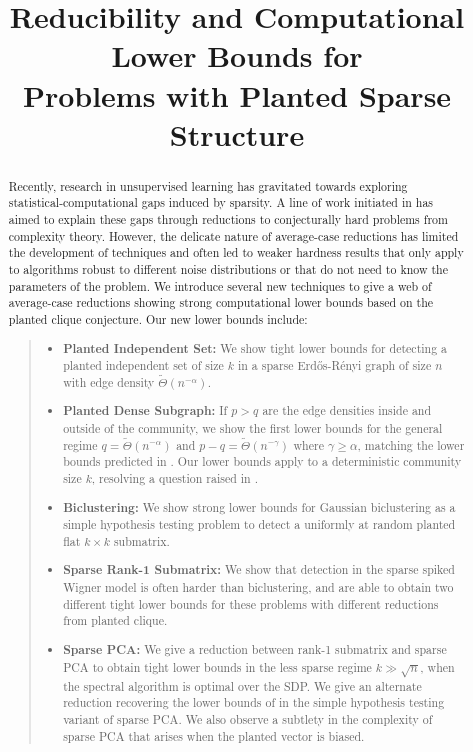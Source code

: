 \documentclass[final,12pt]{colt2018}
\title[Reducibility and Computational Lower Bounds]{Reducibility and Computational Lower Bounds for\\ Problems with Planted Sparse Structure}
\begin{document}
\maketitle

\setcounter{page}{48}

\begin{abstract}
Recently, research in unsupervised learning has gravitated towards exploring statistical-computational gaps induced by sparsity. A line of work initiated in \cite{berthet2013complexity} has aimed to explain these gaps through reductions to conjecturally hard problems from complexity theory. However, the delicate nature of average-case reductions has limited the development of techniques and often led to weaker hardness results that only apply to algorithms robust to different noise distributions or that do not need to know the parameters of the problem. We introduce several new techniques to give a web of average-case reductions showing strong computational lower bounds based on the planted clique conjecture. Our new lower bounds include:
\begin{quote}
\begin{itemize}
\item \textbf{Planted Independent Set:} We show tight lower bounds for detecting a planted independent set of size $k$ in a sparse Erd\H{o}s-R\'{e}nyi graph of size $n$ with edge density $\tilde{\Theta}(n^{-\alpha})$.
\item \textbf{Planted Dense Subgraph:} If $p > q$ are the edge densities inside and outside of the community, we show the first lower bounds for the general regime $q = \tilde{\Theta}(n^{-\alpha})$ and $p - q = \tilde{\Theta}(n^{-\gamma})$ where $\gamma \ge \alpha$, matching the lower bounds predicted in \cite{chen2016statistical}. Our lower bounds apply to a deterministic community size $k$, resolving a question raised in \cite{hajek2015computational}.
\item \textbf{Biclustering:} We show strong lower bounds for Gaussian biclustering as a simple hypothesis testing problem to detect a uniformly at random planted flat $k \times k$ submatrix.
\item \textbf{Sparse Rank-1 Submatrix:} We show that detection in the sparse spiked Wigner model is often harder than biclustering, and are able to obtain two different tight lower bounds for these problems with different reductions from planted clique.
\item \textbf{Sparse PCA:} We give a reduction between rank-1 submatrix and sparse PCA to obtain tight lower bounds in the less sparse regime $k \gg \sqrt{n}$, when the spectral algorithm is optimal over the SDP. We give an alternate reduction recovering the lower bounds of \cite{berthet2013complexity, gao2017sparse} in the simple hypothesis testing variant of sparse PCA. We also observe a subtlety in the complexity of sparse PCA that arises when the planted vector is biased.

\end{itemize}
\end{quote}
\end{abstract}
\end{document}
